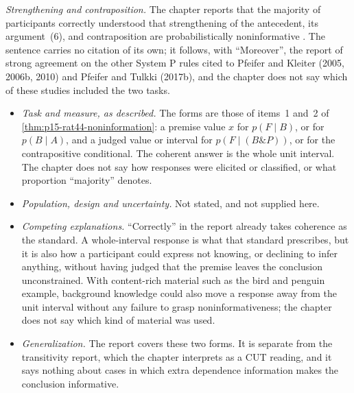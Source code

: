 \emph{Strengthening and contraposition.} The chapter reports that the
majority of participants correctly understood that strengthening of
the antecedent, its argument~(6), and contraposition are
probabilistically noninformative \cite[p.~281]{Pfeifer2021ProbabilityLogic}.
The sentence carries no citation of its own; it follows, with
``Moreover'', the report of strong agreement on the other System P
rules cited to Pfeifer and Kleiter (2005, 2006b, 2010) and Pfeifer and
Tulkki (2017b), and the chapter does not say which of these studies
included the two tasks.
\begin{itemize}
\item \emph{Task and measure, as described.} The forms are those of
      items~1 and~2 of \cref{thm:p15-rat44-noninformation}: a premise
      value \(x\) for \(p(F\mid B)\), or for \(p(B\mid A)\), and a judged
      value or interval for \(p(F\mid(B\mathbin{\&}P))\), or for the
      contrapositive conditional. The coherent answer is the whole unit
      interval. The chapter does not say how responses were elicited or
      classified, or what proportion ``majority'' denotes.
\item \emph{Population, design and uncertainty.} Not stated, and not
      supplied here.
\item \emph{Competing explanations.} ``Correctly'' in the report
      already takes coherence as the standard. A whole-interval response
      is what that standard prescribes, but it is also how a participant
      could express not knowing, or declining to infer anything, without
      having judged that the premise leaves the conclusion unconstrained.
      With content-rich material such as the bird and penguin example,
      background knowledge could also move a response away from the
      unit interval without any failure to grasp noninformativeness; the
      chapter does not say which kind of material was used.
\item \emph{Generalization.} The report covers these two forms. It is
      separate from the transitivity report, which the chapter interprets
      as a CUT reading, and it says nothing about cases in which extra
      dependence information makes the conclusion informative.
\end{itemize}

